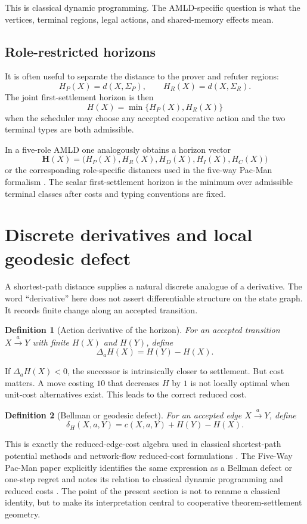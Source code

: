 \documentclass[11pt]{article}
\newtheorem{definition}{Definition}[section]
\theoremstyle{remark}
\begin{document}
This is classical dynamic programming. The AMLD-specific question is what the vertices, terminal regions, legal actions, and shared-memory effects mean.

\subsection{Role-restricted horizons}

It is often useful to separate the distance to the prover and refuter regions:
\[
H_P(X)=d(X,\Sigma_P),
\qquad
H_R(X)=d(X,\Sigma_R).
\]
The joint first-settlement horizon is then
\[
H(X)=\min\{H_P(X),H_R(X)\}
\]
when the scheduler may choose any accepted cooperative action and the two terminal types are both admissible.

In a five-role AMLD one analogously obtains a horizon vector
\[
\mathbf H(X)=\bigl(H_P(X),H_R(X),H_D(X),H_I(X),H_C(X)\bigr)
\]
or the corresponding role-specific distances used in the five-way Pac-Man formalism \cite{TennesonPacMan}. The scalar first-settlement horizon is the minimum over admissible terminal classes after costs and typing conventions are fixed.

\section{Discrete derivatives and local geodesic defect}

A shortest-path distance supplies a natural discrete analogue of a derivative. The word ``derivative'' here does not assert differentiable structure on the state graph. It records finite change along an accepted transition.

\begin{definition}[Action derivative of the horizon]
For an accepted transition $X\xrightarrow{a}Y$ with finite $H(X)$ and $H(Y)$, define
\[
\Delta_a H(X)=H(Y)-H(X).
\]
\end{definition}

If $\Delta_aH(X)<0$, the successor is intrinsically closer to settlement. But cost matters. A move costing $10$ that decreases $H$ by $1$ is not locally optimal when unit-cost alternatives exist. This leads to the correct reduced cost.

\begin{definition}[Bellman or geodesic defect]
For an accepted edge $X\xrightarrow{a}Y$, define
\[
\boxed{\delta_H(X,a,Y)=c(X,a,Y)+H(Y)-H(X).}
\]
\end{definition}

This is exactly the reduced-edge-cost algebra used in classical shortest-path potential methods and network-flow reduced-cost formulations \cite{Bellman1957,Ahuja1993}. The Five-Way Pac-Man paper explicitly identifies the same expression as a Bellman defect or one-step regret and notes its relation to classical dynamic programming and reduced costs \cite{TennesonPacMan}. The point of the present section is not to rename a classical identity, but to make its interpretation central to cooperative theorem-settlement geometry.
\end{document}
